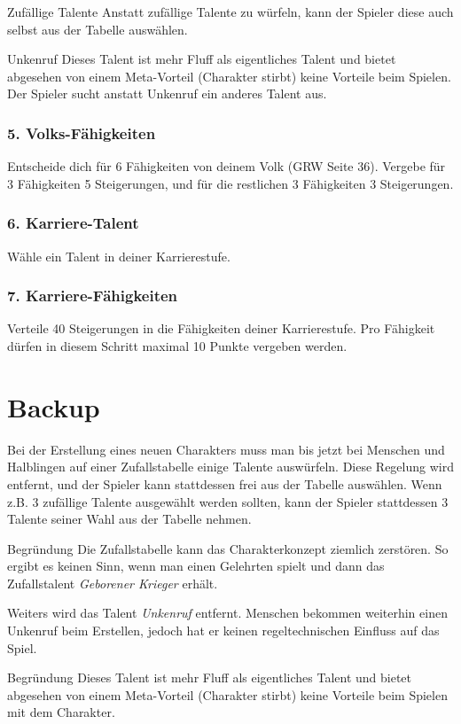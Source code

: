 \documentclass[a4paper,10pt,twoside,twocolumn,openany,nodeprecatedcode,bg=print]{dndbook}
\begin{document}
\begin{DndComment}{Zufällige Talente}
  Anstatt zufällige Talente zu würfeln, kann der Spieler diese auch selbst aus der Tabelle auswählen.
\end{DndComment}

\begin{DndComment}{Unkenruf}
  Dieses Talent ist mehr Fluff als eigentliches Talent und bietet abgesehen von einem Meta-Vorteil (Charakter stirbt) keine Vorteile beim Spielen.
  Der Spieler sucht anstatt Unkenruf ein anderes Talent aus.
\end{DndComment}

\subsection[]{5. Volks-Fähigkeiten}
Entscheide dich für 6 Fähigkeiten von deinem Volk (GRW Seite 36). 
Vergebe für 3 Fähigkeiten 5 Steigerungen, und für die restlichen 3 Fähigkeiten 3 Steigerungen.

\subsection[]{6. Karriere-Talent}
Wähle ein Talent in deiner Karrierestufe. 

\subsection[]{7. Karriere-Fähigkeiten}
Verteile 40 Steigerungen in die Fähigkeiten deiner Karrierestufe.
Pro Fähigkeit dürfen in diesem Schritt maximal 10 Punkte vergeben werden.

\chapter[short]{Backup}

Bei der Erstellung eines neuen Charakters muss man bis jetzt bei Menschen und Halblingen auf einer Zufallstabelle einige Talente auswürfeln.
Diese Regelung wird entfernt, und der Spieler kann stattdessen frei aus der Tabelle auswählen. Wenn z.B. 3 zufällige Talente ausgewählt werden sollten, kann der Spieler stattdessen 3 Talente seiner Wahl aus der Tabelle nehmen.

\begin{DndComment}{Begründung}
  Die Zufallstabelle kann das Charakterkonzept ziemlich zerstören. So ergibt es keinen Sinn, wenn man einen Gelehrten spielt und dann das Zufallstalent \textit{Geborener Krieger} erhält.
\end{DndComment}

Weiters wird das Talent \textit{Unkenruf} entfernt. 
Menschen bekommen weiterhin einen Unkenruf beim Erstellen, jedoch hat er keinen regeltechnischen Einfluss auf das Spiel.

\begin{DndComment}{Begründung}
  Dieses Talent ist mehr Fluff als eigentliches Talent und bietet abgesehen von einem Meta-Vorteil (Charakter stirbt) keine Vorteile beim Spielen mit dem Charakter.
\end{DndComment}
\end{document}
